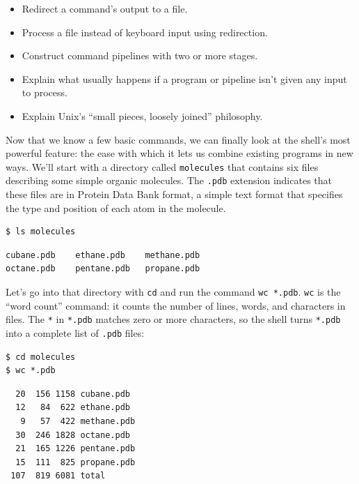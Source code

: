 \documentclass[]{book}
\begin{document}
\begin{itemize}
\item
  Redirect a command's output to a file.
\item
  Process a file instead of keyboard input using redirection.
\item
  Construct command pipelines with two or more stages.
\item
  Explain what usually happens if a program or pipeline isn't given any
  input to process.
\item
  Explain Unix's ``small pieces, loosely joined'' philosophy.
\end{itemize}

Now that we know a few basic commands, we can finally look at the
shell's most powerful feature: the ease with which it lets us combine
existing programs in new ways. We'll start with a directory called
\texttt{molecules} that contains six files describing some simple
organic molecules. The \texttt{.pdb} extension indicates that these
files are in Protein Data Bank format, a simple text format that
specifies the type and position of each atom in the molecule.

\begin{verbatim}
$ ls molecules
\end{verbatim}

\begin{verbatim}
cubane.pdb    ethane.pdb    methane.pdb
octane.pdb    pentane.pdb   propane.pdb
\end{verbatim}

Let's go into that directory with \texttt{cd} and run the command
\texttt{wc *.pdb}. \texttt{wc} is the ``word count'' command: it counts
the number of lines, words, and characters in files. The \texttt{*} in
\texttt{*.pdb} matches zero or more characters, so the shell turns
\texttt{*.pdb} into a complete list of \texttt{.pdb} files:

\begin{verbatim}
$ cd molecules
$ wc *.pdb
\end{verbatim}

\begin{verbatim}
  20  156 1158 cubane.pdb
  12   84  622 ethane.pdb
   9   57  422 methane.pdb
  30  246 1828 octane.pdb
  21  165 1226 pentane.pdb
  15  111  825 propane.pdb
 107  819 6081 total
\end{verbatim}
\end{document}
